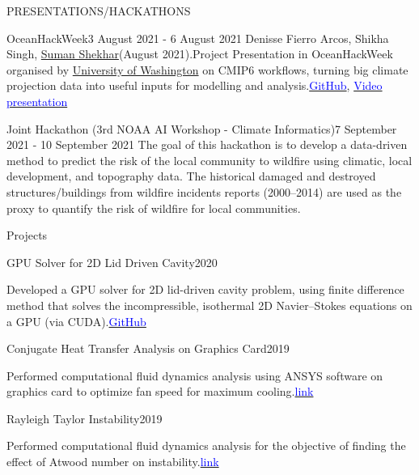 \documentclass{resume} %
\begin{document}
\begin{rSection}{PRESENTATIONS/HACKATHONS}
\begin{rSubsection}{OceanHackWeek}{3 August 2021 - 6 August 2021}{}
Denisse Fierro Arcos, Shikha Singh, \underline{Suman Shekhar}(August 2021).Project Presentation in OceanHackWeek organised by \underline{University of Washington}  on CMIP6 workflows, turning big climate projection data into useful inputs for modelling and analysis.\href{https://github.com/oceanhackweek/ohw21-proj-cmip-ard}{\textcolor{blue}{GitHub}}, \href{https://youtu.be/Y5e50p39mnQ}{\textcolor{blue}{Video presentation}}  
\end{rSubsection}
\begin{rSubsection}{Joint Hackathon (3rd NOAA AI Workshop - Climate Informatics)}{7 September 2021 - 10 September 2021}{}
The goal of this hackathon is to develop a data-driven method to predict the risk of the local community to wildfire using climatic, local development, and topography data. The historical damaged and destroyed structures/buildings from wildfire incidents reports (2000–2014) are used as the proxy to quantify the risk of wildfire for local communities. 
\end{rSubsection}
\end{rSection}
\begin{rSection}{Projects}
\begin{rSubsection}{GPU Solver for 2D Lid Driven Cavity}{2020}{}
\item Developed a GPU solver for 2D lid-driven cavity problem, using finite difference method that solves the incompressible, isothermal 2D Navier–Stokes equations on a GPU (via CUDA).\href{https://github.com/Sumanshekhar17/3rd-year-project}{\textcolor{blue}{GitHub}}
\end{rSubsection}
\begin{rSubsection}{Conjugate Heat Transfer Analysis on Graphics Card}{2019}{}
\item Performed computational fluid dynamics analysis using ANSYS software on graphics card to optimize fan speed for maximum cooling.\href{https://skill-lync.com/student-projects/conjugate-heat-transfer-analysis-on-a-graphics-card-62}{\textcolor{blue}{link}}
\end{rSubsection}

\begin{rSubsection}{Rayleigh Taylor Instability}{2019}{}
\item Performed computational fluid dynamics analysis for the objective of finding the effect of Atwood number on instability.\href{https://skill-lync.com/student-projects/rayleigh-taylor-instability-challenge-35}{\textcolor{blue}{link}}
\end{rSubsection}

\end{rSection}
\end{document}
